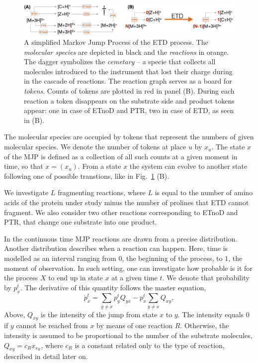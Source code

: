 \documentclass{llncs}
\begin{document}
\begin{figure}[h]
        \center
        \includegraphics[width=.8\textwidth]{petrinet.png}
        \caption{A simplified Markov Jump Process of the ETD process. The \textit{molecular species} are depicted in black and the \textit{reactions} in orange. The dagger symbolizes the \textit{cemetary} -- a specie that collects all molecules introduced to the instrument that lost their charge during in the cascade of reactions. The reaction graph serves as a board for \textit{tokens}. Counts of tokens are plotted in red in panel (B). During each reaction a token disappears on the substrate side and product tokens appear: one in case of ETnoD and PTR, two in case of ETD, as seen in (B).}\label{img::petrinet}
\end{figure}

        The molecular species are occupied by tokens that represent the numbers of given molecular species. We denote the number of tokens at place $u$ by $x_u$. The state $x$ of the MJP is defined as a collection of all such counts at a given moment in time, so that $x = (x_u)$.  From a state $x$ the system can evolve to another state following one of possible transtions, like in Fig.~\ref{img::petrinet} (B).

        We investigate $L$ fragmenting reactions, where $L$ is equal to the number of amino acids of the protein under study minus the number of prolines that ETD cannot fragment. We also consider two other reactions corresponding to ETnoD and PTR, that change one substrate into one product.

        In the continuous time MJP reactions are drawn from a precise distribution. Another distribution describes when a reaction can happen. Here, time is modelled as an interval ranging from $0$, the beginning of the process, to $1$,  the moment of observation. In such setting, one can investigate how probable is it for the process $X$ to end up in state $x$ at a given time $t$. We denote that probability by $p_x^t$. The derivative of this quantity follows the master equation,
                $$\dot{p}_x^t = \sum_{y\not=x} p_y^t Q_{yx} - p_x^t \sum_{y\not=x} Q_{xy},$$
        Above, $Q_{xy}$ is the intensity of the jump from state $x$ to $y$. The intensity equals $0$ if $y$ cannot be reached from $x$ by means of one reaction $R$. Otherwise, the intensity is assumed to be proportional to the number of the substrate molecules, $Q_{xy}=c_R x_{s_R}$,  where $c_R$ is a constant related only to the type of reaction, described in detail later on.
\end{document}
